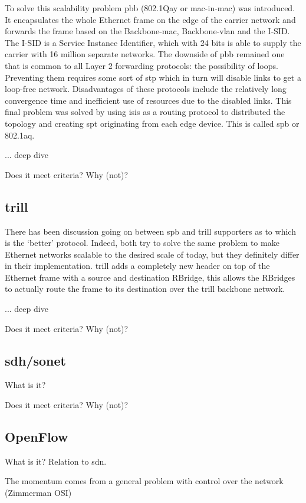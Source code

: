 To solve this scalability problem \ac{pbb} (802.1Qay or \ac{mac}-in-\ac{mac}) was introduced. It encapsulates the whole Ethernet frame on the edge of the carrier network and forwards the frame based on the Backbone-\ac{mac}, Backbone-\ac{vlan} and the I-SID. The I-SID is a Service Instance Identifier, which with 24 bits is able to supply the carrier with 16 million separate networks. The downside of \ac{pbb} remained one that is common to all Layer 2 forwarding protocols: the possibility of loops. Preventing them requires some sort of \ac{stp} which in turn will disable links to get a loop-free network. Disadvantages of these protocols include the relatively long convergence time and inefficient use of resources due to the disabled links. This final problem was solved by using \acs{isis} as a routing protocol to distributed the topology and creating \ac{spt} originating from each edge device. This is called \ac{spb} or 802.1aq.

... deep dive

Does it meet criteria? Why (not)?


\subsection{\acs{trill}} %
\label{sub:trill}
There has been discussion going on between \ac{spb} and \ac{trill} supporters as to which is the `better' protocol. Indeed, both try to solve the same problem to make Ethernet networks scalable to the desired scale of today, but they definitely differ in their implementation. \ac{trill} adds a completely new header on top of  the Ethernet frame with a source and destination RBridge, this allows the RBridges to actually route the frame to its destination over the \ac{trill} backbone network.

... deep dive

Does it meet criteria? Why (not)?


\subsection{\acs{sdh}/\acs{sonet}} %
\label{sub:sdh_sonet}
What is it?

Does it meet criteria? Why (not)?


\subsection{OpenFlow} %
\label{sub:openflow}
What is it? Relation to \ac{sdn}.

The momentum comes from a general problem with control over the network (Zimmerman OSI)




